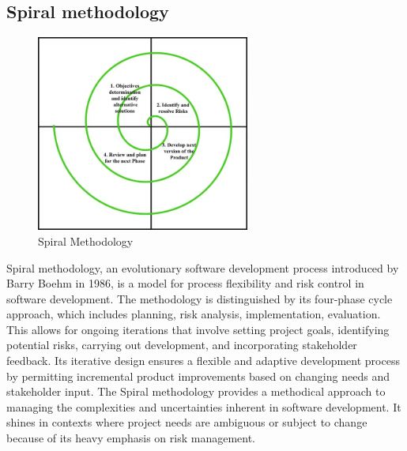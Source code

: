 \subsection{Spiral methodology}
\begin{figure}[!ht]
    \centering
    \includegraphics[width=7cm]{Images/spiral.png}
    \caption{Spiral Methodology \citep{kumarpal_2018_software}}
    \label{fig:spiral}
\end{figure}
Spiral methodology, an evolutionary software development process introduced by Barry Boehm in 1986, is a model for process flexibility and risk control in software development. \citep{boehm_1986_a}
The methodology is distinguished by its four-phase cycle approach, which includes planning, risk analysis, implementation, evaluation.
This allows for ongoing iterations that involve setting project goals, identifying potential risks, carrying out development, and incorporating stakeholder feedback.
Its iterative design ensures a flexible and adaptive development process by permitting incremental product improvements based on changing needs and stakeholder input.
The Spiral methodology provides a methodical approach to managing the complexities and uncertainties inherent in software development. 
It shines in contexts where project needs are ambiguous or subject to change because of its heavy emphasis on risk management. 

